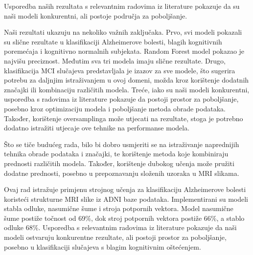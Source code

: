 \documentclass[zavrsnirad,upload]{fer}
\begin{document}
Usporedba naših rezultata s relevantnim radovima iz literature pokazuje da su naši modeli konkurentni, ali postoje područja za poboljšanje.

Naši rezultati ukazuju na nekoliko važnih zaključaka. 
Prvo, svi modeli pokazali su slične rezultate u klasifikaciji Alzheimerove bolesti, blagih kognitivnih poremećaja i kognitivno normalnih subjekata. Random Forest model pokazao je najvišu preciznost. Međutim sva tri modela imaju slične rezultate.
Drugo, klasifikacija MCI slučajeva predstavljala je izazov za sve modele, što sugerira potrebu za daljnjim istraživanjem u ovoj domeni, možda kroz korištenje dodatnih značajki ili kombinaciju različitih modela.
Treće, iako su naši modeli konkurentni, usporedba s radovima iz literature pokazuje da postoji prostor za poboljšanje, posebno kroz optimizaciju modela i poboljšanje metoda obrade podataka. Također, korištenje oversamplinga može utjecati na rezultate, stoga je potrebno dodatno istražiti utjecaje ove tehnike na performanse modela.

Što se tiče budućeg rada, bilo bi dobro usmjeriti se na istraživanje naprednijih tehnika obrade podataka i značajki, te korištenje metoda koje kombiniraju prednosti različitih modela. Također, korištenje dubokog učenja može pružiti dodatne prednosti, posebno u prepoznavanju složenih uzoraka u MRI slikama.








\begin{sazetak}
	Ovaj rad istražuje primjenu strojnog učenja za klasifikaciju Alzheimerove bolesti koristeći strukturne MRI slike iz ADNI baze podataka. Implementirani su modeli stabla odluke, nasumične šume i stroja potpornih vektora. Model nasumične šume postiže točnost od 69\%, dok stroj potpornih vektora postiže 66\%, a stablo odluke 68\%. Usporedba s relevantnim radovima iz literature pokazuje da naši modeli ostvaruju konkurentne rezultate, ali postoji prostor za poboljšanje, posebno u klasifikaciji slučajeva s blagim kognitivnim oštećenjem.
\end{sazetak}
\end{document}

